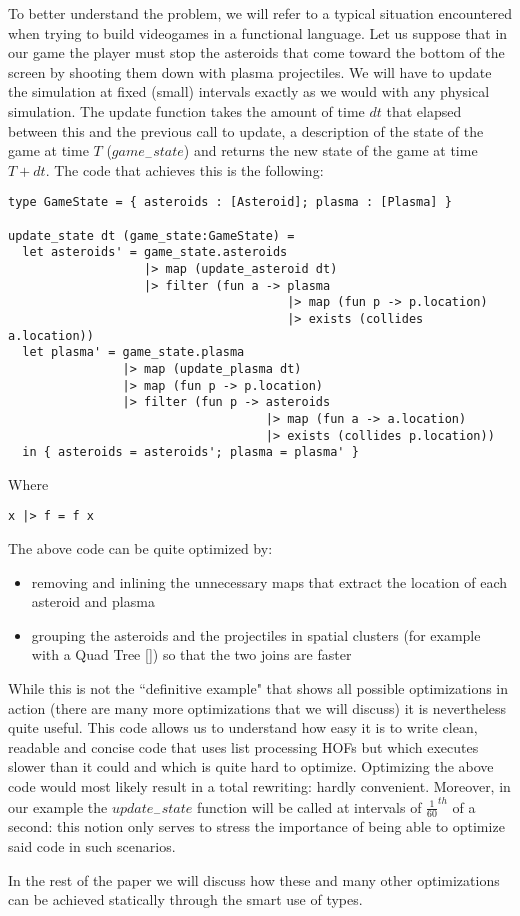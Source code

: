 
To better understand the problem, we will refer to a typical situation encountered when trying to build videogames in a functional language. Let us suppose that in our game the player must stop the asteroids that come toward the bottom of the screen by shooting them down with plasma projectiles. We will have to update the simulation at fixed (small) intervals exactly as we would with any physical simulation. The update function takes the amount of time $dt$ that elapsed between this and the previous call to update, a description of the state of the game at time $T$ ($game_{-}state$) and returns the new state of the game at time $T+dt$. The code that achieves this is the following:

\begin{lstlisting}
type GameState = { asteroids : [Asteroid]; plasma : [Plasma] }

update_state dt (game_state:GameState) =
  let asteroids' = game_state.asteroids
                   |> map (update_asteroid dt)
                   |> filter (fun a -> plasma 
                                       |> map (fun p -> p.location) 
                                       |> exists (collides a.location))
  let plasma' = game_state.plasma 
                |> map (update_plasma dt)
                |> map (fun p -> p.location)
                |> filter (fun p -> asteroids
                                    |> map (fun a -> a.location) 
                                    |> exists (collides p.location))
  in { asteroids = asteroids'; plasma = plasma' }
\end{lstlisting}

Where 

\begin{lstlisting}
x |> f = f x
\end{lstlisting}

The above code can be quite optimized by:
\begin{itemize}
\item removing and inlining the unnecessary maps that extract the location of each asteroid and plasma
\item grouping the asteroids and the projectiles in spatial clusters (for example with a Quad Tree []) so that the two joins are faster
\end{itemize}

While this is not the ``definitive example" that shows all possible optimizations in action (there are many more optimizations that we will discuss) it is nevertheless quite useful. This code allows us to understand how easy it is to write clean, readable and concise code that uses list processing HOFs but which executes slower than it could and which is quite hard to optimize. Optimizing the above code would most likely result in a total rewriting: hardly convenient. Moreover, in our example the $update_{-}state$ function will be called at intervals of $\frac{1}{60}^{th}$ of a second: this notion only serves to stress the importance of being able to optimize said code in such scenarios.

In the rest of the paper we will discuss how these and many other optimizations can be achieved statically through the smart use of types.
